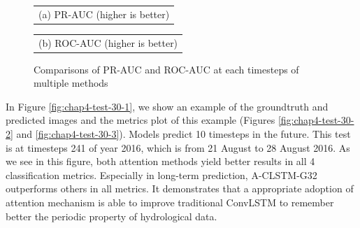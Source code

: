\begin{figure}[h!]
    \begin{center}
    \begin{tabular}[b]{c}
         \\
        \small (a) PR-AUC (higher is better)
    \end{tabular} 
    \begin{tabular}[b]{c}
         \\
        \small (b) ROC-AUC (higher is better)
    \end{tabular}
    \end{center}
    \caption{Comparisons of PR-AUC and ROC-AUC at each timesteps of multiple methods}
    \label{fig:metrics-comparisons-timesteps-2}
\end{figure}

In Figure \ref{fig:chap4-test-30-1}, we show an example of the groundtruth and predicted images and the metrics plot of this example (Figures \ref{fig:chap4-test-30-2} and \ref{fig:chap4-test-30-3}). Models predict 10 timesteps in the future. This test is at timesteps 241 of year 2016, which is from 21 August to 28 August 2016. As we see in this figure, both attention methods yield better results in all 4 classification metrics. Especially in long-term prediction, A-CLSTM-G32 outperforms others in all metrics. It demonstrates that a appropriate adoption of attention mechanism is able to improve traditional ConvLSTM to remember better the periodic property of hydrological data.  

